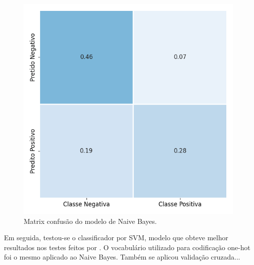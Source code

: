 \begin{figure}[h]
\begin{center} {
    \begin{center}
    \includegraphics[scale=0.65]{images/nb_cm.png}
    \caption{Matrix confusão do modelo de Naive Bayes.}
    \label{fig:nb_confusion}
    \end{center}
}
\end{center}
\end{figure}

Em seguida, testou-se o classificador por SVM, modelo que obteve melhor
resultados nos testes feitos por \citet{go09}.
O vocabulário utilizado para codificação one-hot foi o mesmo aplicado ao
Naive Bayes.
Também se aplicou validação cruzada...

